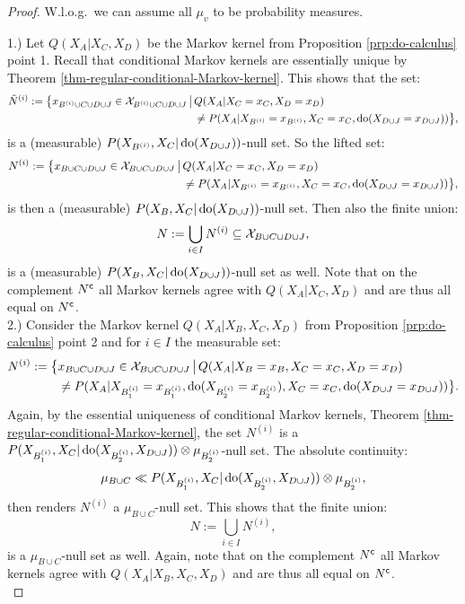 \restatethmasdocalculusdetail*
\begin{proof}
 W.l.o.g.\ we can assume all $\mu_v$ to be probability measures.

 1.) Let $Q(X_A|X_C,X_D)$ be the Markov kernel from Proposition \ref{prp:do-calculus} point 1.
Recall that conditional Markov kernels are essentially unique by Theorem \ref{thm-regular-conditional-Markov-kernel}. 
    This shows that the set:
\begin{align*}
    \tilde N^{(i)} := \bigl\{ x_{B^{(i)} \cup C \cup D \cup J} \in \mathcal{X}_{B^{(i)} \cup C \cup D \cup J} \,\big|\,
       & Q(X_A|X_C=x_C,X_D=x_D)\\ 
       &\neq P(X_A|X_{B^{(i)}}=x_{B^{(i)}},X_C=x_C,\operatorname{do}(X_{D\cup J}=x_{D \cup J})) \bigr\},
\end{align*}
is a (measurable) $P(X_{B^{(i)}},X_C|\operatorname{do}(X_{D\cup J}))$-null set. So the lifted set:
\begin{align*}
    N^{(i)} := \bigl\{ x_{B \cup C \cup D \cup J} \in \mathcal{X}_{B \cup C \cup D \cup J} \,\big|\,
       & Q(X_A|X_C=x_C,X_D=x_D)\\ 
       &\neq P(X_A|X_{B^{(i)}}=x_{B^{(i)}},X_C=x_C,\operatorname{do}(X_{D\cup J}=x_{D \cup J})) \bigr\},
\end{align*}
is then a (measurable) $P(X_B,X_C|\operatorname{do}(X_{D\cup J}))$-null set. Then also the finite union:
 \[ N := \bigcup_{i \in I} N^{(i)}  \subseteq \mathcal{X}_{B \cup C \cup D \cup J},  \]
 is a (measurable) $P(X_B,X_C|\operatorname{do}(X_{D\cup J}))$-null set as well. 
 Note that on the complement $N^{\mathsf{c}}$ all Markov kernels agree with $Q(X_A|X_C,X_D)$ and are thus all equal on $N^{\mathsf{c}}$.\\

2.) Consider the Markov kernel $Q(X_A|X_B,X_C,X_D)$ from Proposition \ref{prp:do-calculus} point 2
    and for $i \in I$ the measurable set:
\begin{align*}
     N^{(i)} :=  \bigl\{ & x_{B \cup C \cup D \cup J} \in \mathcal{X}_{B \cup C \cup D \cup J} \,\big|\,
        Q(X_A|X_B=x_B,X_C=x_C,X_D=x_D)\\ 
       &\neq P(X_A|X_{B_1^{(i)}}=x_{B_1^{(i)}},\operatorname{do}(X_{B_2^{(i)}}=x_{B_2^{(i)}}),X_C=x_C,\operatorname{do}(X_{D\cup J}=x_{D\cup J}))  \bigr\}.
\end{align*}
Again, by the essential uniqueness of conditional Markov kernels, Theorem \ref{thm-regular-conditional-Markov-kernel}, the set $N^{(i)}$ is 
a $P(X_{B_1^{(i)}},X_C|\operatorname{do}(X_{B_2^{(i)}},X_{D\cup J})) \otimes \mu_{B_2^{(i)}}$-null set.
The absolute continuity:
 \[ \mu_{B \cup C} \ll  P(X_{B_1^{(i)}},X_C|\operatorname{do}(X_{B_2^{(i)}},X_{D\cup J})) \otimes \mu_{B_2^{(i)}}, \]
 then renders $N^{(i)}$ a $\mu_{B \cup C}$-null set. 
 This shows that the finite union:
 \[ N := \bigcup_{i \in I} N^{(i)}, \]
 is a $\mu_{B \cup C}$-null set as well.  Again, note that on the complement $N^{\mathsf{c}}$ all Markov kernels agree with $Q(X_A|X_B,X_C,X_D)$ and are thus all equal on $N^{\mathsf{c}}$. \\


\end{proof}
